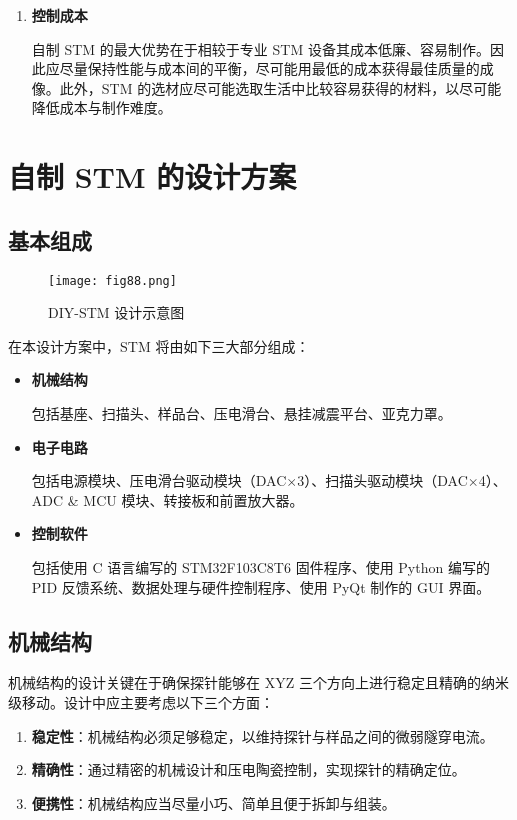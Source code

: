 \documentclass{article}
\begin{document}
\begin{spacing}{1.5}
\begin{enumerate}
		
		\item \textbf{控制成本}\par
		\qquad 自制 STM 的最大优势在于相较于专业 STM 设备其成本低廉、容易制作。因此应尽量保持性能与成本间的平衡，尽可能用最低的成本获得最佳质量的成像。此外，STM 的选材应尽可能选取生活中比较容易获得的材料，以尽可能降低成本与制作难度。
		
	\end{enumerate}
	
	
	
	
	
	
	
	
	
	
	\clearpage
	\section{自制 STM 的设计方案}
	\setParDis %
	\subsection{基本组成}
	\begin{figure}[htbp]
		\centering 
		\texttt{[image: fig88.png]}
		\caption{DIY-STM 设计示意图}
	\end{figure}	
	
	在本设计方案中，STM 将由如下三大部分组成：
	
	\begin{itemize}
		\item \textbf{机械结构}\par
		\qquad 包括基座、扫描头、样品台、压电滑台、悬挂减震平台、亚克力罩。
		
		\item \textbf{电子电路}\par
		\qquad 包括电源模块、压电滑台驱动模块（DAC$\times$3）、扫描头驱动模块（DAC$\times$4）、ADC \& MCU 模块、转接板和前置放大器。
		
		
		\item \textbf{控制软件}\par
		\qquad 包括使用 C 语言编写的 STM32F103C8T6 固件程序、使用 Python 编写的 PID 反馈系统、数据处理与硬件控制程序、使用 PyQt 制作的 GUI 界面。
		
	\end{itemize}
	
	
	
	
	
	
	
	
	\subsection{机械结构}
	机械结构的设计关键在于确保探针能够在 XYZ 三个方向上进行稳定且精确的纳米级移动。设计中应主要考虑以下三个方面：
	\begin{enumerate}
		\item \textbf{稳定性}：机械结构必须足够稳定，以维持探针与样品之间的微弱隧穿电流。
		\item \textbf{精确性}：通过精密的机械设计和压电陶瓷控制，实现探针的精确定位。
		\item \textbf{便携性}：机械结构应当尽量小巧、简单且便于拆卸与组装。
	\end{enumerate}
	

\end{spacing}
\end{document}
